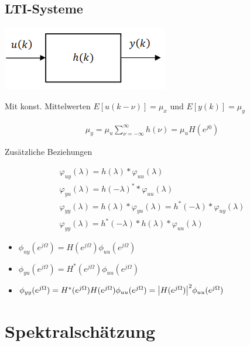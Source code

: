 \documentclass[10pt,a4paper]{article}
\begin{document}
\subsection{LTI-Systeme}
  \begin{center}
      \includegraphics[width=.15\textwidth]{./img/lti.png}
  \end{center}
Mit konst. Mittelwerten $E[u(k-\nu)]=\mu_x$ und $E[y(k)]=\mu_y$
  \begin{mdframed}[style=exercise]
    \begin{align}
        \mu_y = \mu_u \sum_{\nu=-\infty}^{\infty} h(\nu) = \mu_u H(e^{j0})
    \end{align}
  \end{mdframed}
  Zusätzliche Beziehungen
  \begin{mdframed}[style=exercise]
    \begin{align}
        \varphi_{uy}(\lambda) = h(\lambda)*\varphi_{uu}(\lambda) \\
        \varphi_{yu}(\lambda) = h(-\lambda)^**\varphi_{uu}(\lambda) \\
        \varphi_{yy}(\lambda) = h(\lambda)*\varphi_{yu}(\lambda) = h^*(-\lambda)*\varphi_{uy}(\lambda) \\
        \varphi_{yy}(\lambda) = h^*(-\lambda)*h(\lambda)*\varphi_{uu}(\lambda)
    \end{align}
  \end{mdframed}
  \begin{itemize}
      \item $\phi_{uy}(e^{j\Omega}) = H(e^{j\Omega})\phi_{uu}(e^{j\Omega})$
      \item $\phi_{yu}(e^{j\Omega}) = H^*(e^{j\Omega})\phi_{uu}(e^{j\Omega})$
      \item $\phi_{yy}(e^{j\Omega}) = H^*(e^{j\Omega})H(e^{j\Omega})\phi_{uu}(e^{j\Omega}) =\abs{H(e^{j\Omega})}^2 \phi_{uu}(e^{j\Omega}) $ 
  \end{itemize}
  \section{Spektralschätzung}
\end{document}
